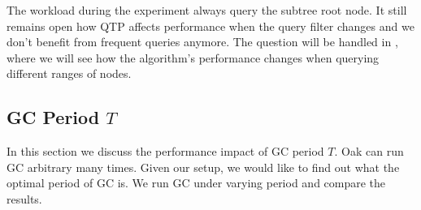 \documentclass[abstracton,12pt]{scrartcl}
\theoremstyle{definition}
\begin{document}
The workload during the experiment always query the subtree root node. It still remains
open how QTP affects performance when the query filter changes and we don't benefit from
frequent queries anymore. The question will be handled 
in , where we will see how the algorithm's performance changes when
querying different ranges of nodes.

\subsection{GC Period $T$}

\label{sec:periodicity}

In this section we discuss the performance impact of GC period $T$. Oak can run
GC arbitrary many times. Given our setup, we would like to find out what the
optimal period of GC is. We run GC under varying period and compare
the results.

\lipsum[1]


\end{document}
